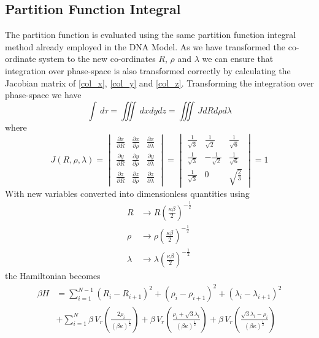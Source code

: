 \subsection{Partition Function Integral}
%
The partition function is evaluated using the same partition function integral method already employed in the DNA Model. As we have transformed the co-ordinate system to the new co-ordinates $R$, $\rho$ and $\lambda$ we can ensure that integration over phase-space is also transformed correctly by calculating the Jacobian matrix of \eqref{col_x}, \eqref{col_y} and \eqref{col_z}. Transforming the integration over phase-space we have
%
\begin{equation}
\int\,d\tau=\iiint\,dxdydz=\iiint\,JdRd\rho d\lambda 
\end{equation}
%
where 
\begin{equation}
J(R,\rho,\lambda) = \begin{vmatrix}
\frac{\partial x}{\partial R} & \frac{\partial x}{\partial \rho} & \frac{\partial x}{\partial \lambda}\\
\frac{\partial y}{\partial R} & \frac{\partial y}{\partial \rho} & \frac{\partial y}{\partial \lambda}\\
\frac{\partial z}{\partial R} & \frac{\partial z}{\partial \rho} & \frac{\partial z}{\partial \lambda}
\end{vmatrix}
= \begin{vmatrix}
\frac{1}{\sqrt{3}} & \frac{1}{\sqrt{2}} & \frac{1}{\sqrt{6}}\\
\frac{1}{\sqrt{3}} & -\frac{1}{\sqrt{2}} & \frac{1}{\sqrt{6}}\\
\frac{1}{\sqrt{3}} & 0 & \sqrt{\frac{2}{3}}
\end{vmatrix}
=1
\end{equation}
%
With new variables converted into dimensionless quantities using
%
\begin{align}
\label{col_dimensionless_quantities}
R&\rightarrow R\left(\frac{\kappa \beta}{2}\right)^{-\frac{1}{2}}\\
\rho&\rightarrow \rho\left(\frac{\kappa \beta}{2}\right)^{-\frac{1}{2}}\nonumber\\
\lambda&\rightarrow \lambda\left(\frac{\kappa \beta}{2}\right)^{-\frac{1}{2}}\nonumber
\end{align}
%
the Hamiltonian becomes
%
\begin{align}\label{col_ham_trans2}
\beta H &= \sum_{i=1}^{N-1}\left(R_i-R_{i+1}\right)^{2}+\left(\rho_i-\rho_{i+1}\right)^{2}+\left(\lambda_i-\lambda_{i+1}\right)^{2} \nonumber\\ 
&+\sum_{i=1}^{N}\beta\,V_{r}\left(\frac{2\rho_i}{\left( \beta \kappa\right)^{\frac{1}{2}}}\right)+\beta\,V_{r}\left(\frac{\rho_i+ \sqrt{3}\lambda_i}{\left( \beta \kappa\right)^{\frac{1}{2}}}\right)+\beta\,V_{r}\left(\frac{\sqrt{3}\lambda_i - \rho_i}{\left( \beta \kappa\right)^{\frac{1}{2}}}\right)
\end{align}
